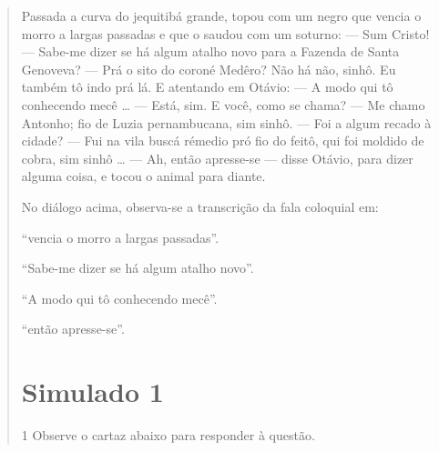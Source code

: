 \begin{quote}

Passada a curva do jequitibá grande, topou com um negro
que vencia o morro a largas passadas e que o saudou com um
soturno:
--- Sum Cristo!
--- Sabe-me dizer se há algum atalho novo para a Fazenda de
Santa Genoveva?
--- Prá o sito do coroné Medêro? Não há não, sinhô. Eu
também tô indo prá lá.
E atentando em Otávio:
--- A modo qui tô conhecendo mecê \ldots{}
--- Está, sim. E você, como se chama?
--- Me chamo Antonho; fio de Luzia pernambucana, sim sinhô.
--- Foi a algum recado à cidade?
--- Fui na vila buscá rémedio pró fio do feitô, qui foi moldido
de cobra, sim sinhô \ldots{}
--- Ah, então apresse-se --- disse Otávio, para dizer alguma
coisa, e tocou o animal para diante.


No diálogo acima, observa-se a transcrição da fala coloquial em:

\begin{escolha}
  
  \item ``vencia o morro a largas passadas''.
  
  \item ``Sabe-me dizer se há algum atalho novo''. 
  
  \item ``A modo qui tô conhecendo mecê''.
  
  \item ``então apresse-se''. 

\end{escolha}


\chapter{Simulado 1}

\num{1} Observe o cartaz abaixo para responder à questão.


\end{quote}
